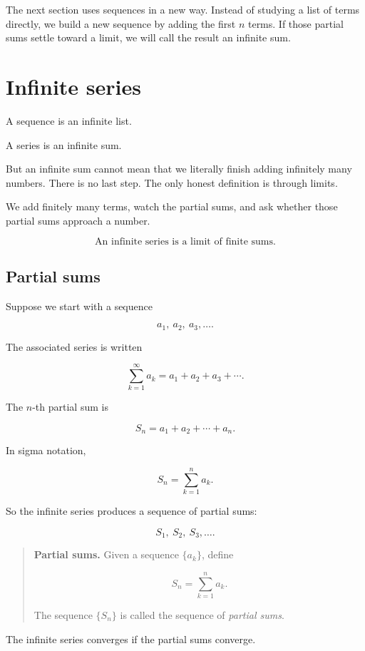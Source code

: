 The next section uses sequences in a new way.  Instead of studying a list of terms
directly, we build a new sequence by adding the first \(n\) terms.  If those partial sums
settle toward a limit, we will call the result an infinite sum.

\section{Infinite series}
\label{sec:infinite-series}

A sequence is an infinite list.

A series is an infinite sum.

But an infinite sum cannot mean that we literally finish adding infinitely many numbers.
There is no last step.  The only honest definition is through limits.

We add finitely many terms, watch the partial sums, and ask whether those partial sums
approach a number.

\[
\boxed{
\text{An infinite series is a limit of finite sums.}
}
\]

\subsection{Partial sums}
\label{subsec:partial-sums}

Suppose we start with a sequence

\[
a_1,\ a_2,\ a_3,\ldots.
\]

The associated series is written

\[
\sum_{k=1}^{\infty}a_k
=
a_1+a_2+a_3+\cdots.
\]

The \(n\)-th partial sum is

\[
S_n=a_1+a_2+\cdots+a_n.
\]

In sigma notation,

\[
S_n=\sum_{k=1}^{n}a_k.
\]

So the infinite series produces a sequence of partial sums:

\[
S_1,\ S_2,\ S_3,\ldots.
\]

\begin{quote}
\textbf{Partial sums.}
Given a sequence \(\{a_k\}\), define

\[
S_n=\sum_{k=1}^{n}a_k.
\]

The sequence \(\{S_n\}\) is called the sequence of \emph{partial sums}.
\end{quote}

The infinite series converges if the partial sums converge.

